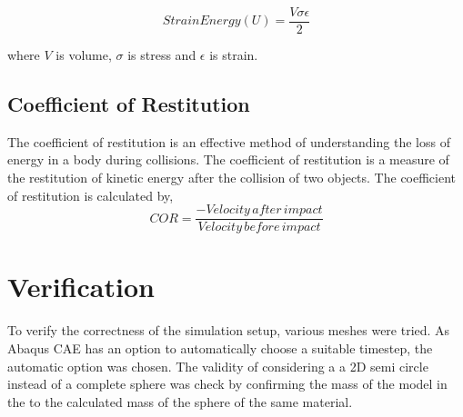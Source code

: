 \begin{equation}
Strain Energy(U) = \frac{V\sigma\epsilon}{2}
\end{equation}

where $V$ is volume, $\sigma$ is stress and $\epsilon$ is strain.

\subsection{Coefficient of Restitution}

The coefficient of restitution is an effective method of understanding the loss of energy in a body during collisions. The coefficient of restitution is a measure of the restitution of kinetic energy after the collision of two objects. 
The coefficient of restitution is calculated by,
\begin{equation}
COR = \frac{-Velocity\, after\, impact}{Velocity\, before\, impact}
\end{equation}
\section{Verification}

To verify the correctness of the simulation setup, various meshes were tried. 
As Abaqus CAE has an option to automatically choose a suitable timestep, the automatic option was chosen.
The validity of considering a a 2D semi circle instead of a complete sphere was check by confirming the mass of the model in the to the calculated mass of the sphere of the same material.